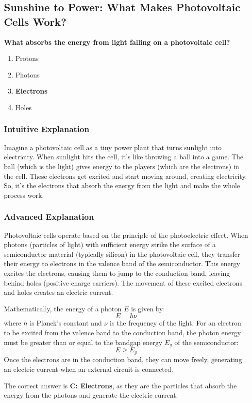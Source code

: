 \subsection{Sunshine to Power: What Makes Photovoltaic Cells Work?}

\begin{tcolorbox}[colback=gray!10!white,colframe=black!75!black,title=\textbf{E6F01}]
\textbf{What absorbs the energy from light falling on a photovoltaic cell?}
\begin{enumerate}[label=\Alph*.]
    \item Protons
    \item Photons
    \item \textbf{Electrons}
    \item Holes
\end{enumerate}
\end{tcolorbox}

\subsubsection*{Intuitive Explanation}
Imagine a photovoltaic cell as a tiny power plant that turns sunlight into electricity. When sunlight hits the cell, it’s like throwing a ball into a game. The ball (which is the light) gives energy to the players (which are the electrons) in the cell. These electrons get excited and start moving around, creating electricity. So, it’s the electrons that absorb the energy from the light and make the whole process work.

\subsubsection*{Advanced Explanation}
Photovoltaic cells operate based on the principle of the photoelectric effect. When photons (particles of light) with sufficient energy strike the surface of a semiconductor material (typically silicon) in the photovoltaic cell, they transfer their energy to electrons in the valence band of the semiconductor. This energy excites the electrons, causing them to jump to the conduction band, leaving behind holes (positive charge carriers). The movement of these excited electrons and holes creates an electric current. 

Mathematically, the energy of a photon \( E \) is given by:
\[
E = h \nu
\]
where \( h \) is Planck's constant and \( \nu \) is the frequency of the light. For an electron to be excited from the valence band to the conduction band, the photon energy must be greater than or equal to the bandgap energy \( E_g \) of the semiconductor:
\[
E \geq E_g
\]
Once the electrons are in the conduction band, they can move freely, generating an electric current when an external circuit is connected.

The correct answer is \textbf{C: Electrons}, as they are the particles that absorb the energy from the photons and generate the electric current.

